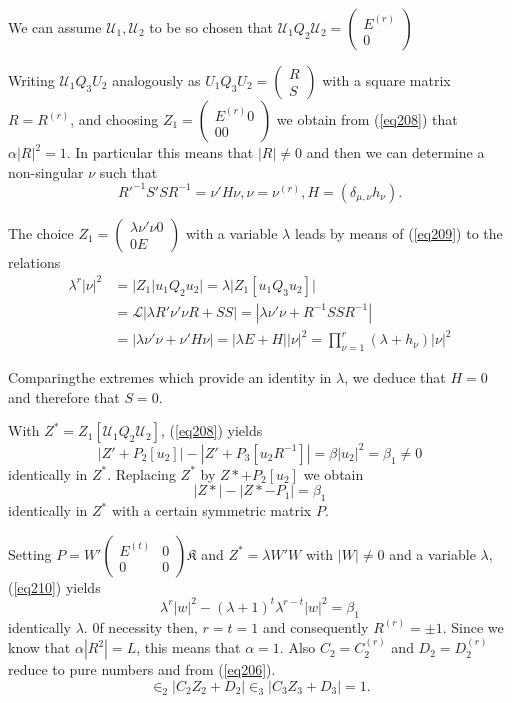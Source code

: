  We can assume $\mathcal{U}_1 , \mathcal{U}_2$ to be so chosen that
 $\mathcal{U}_1 Q_2 \mathcal{U}_ 
 2 = \begin{pmatrix} E^{(r)}\\ 0 \end{pmatrix}$
 
 Writing $\mathcal{U}_1 Q_3  U_2$ analogously as $U_1 Q_3 U_2
 = \begin{pmatrix}  R \\ S \end{pmatrix}$ with a square matrix $R = R
 ^{(r)}$, and choosing $Z_1 = \begin{pmatrix} E^{(r)} 0 \\ 0
   0 \end{pmatrix}$ we obtain from (\ref{eq208}) that $\alpha |R|^2 =1$. In
 particular this means that $|R| \neq 0$ and then we can determine a
 non-singular $\nu$ such that 
 $$
 R'^{-1}S' S R^{-1} = \nu' H \nu , \nu = \nu^{(r)}, H = (\delta_{\mu ,
   \nu} h_{\nu}). 
 $$
 
 The choice $Z_1 = \begin{pmatrix} \lambda \nu' \nu  0 \\ 0
   E \end{pmatrix}$ with a variable $\lambda$ leads by means of
(\ref{eq209}) to the relations 
 \begin{align*}
\lambda^r |\nu |^2 & = | Z_1 | u_1 Q_2 u_2 | = \lambda |Z_1 [ u_1 Q_3 u_2] |\\
& = \mathcal{L}|\lambda R' \nu' \nu R + S S | = |\lambda \nu' \nu +
R^{-1} S S R^{-1}|\\ 
&= |\lambda \nu' \nu + \nu' H \nu | = |\lambda E + H || \nu|^2 =
\prod_{\nu=1}^{r} (\lambda + h_{\nu}) |\nu|^2  
 \end{align*} 
 
 Comparing\pageoriginale the extremes which provide an identity in
 $\lambda$, we deduce that $H = 0$ and therefore that $S= 0$.   
 
 With $Z^* = Z_1 [\mathcal{U}_1 Q_2 \mathcal{U}_2]$, (\ref{eq208})  yields 
 $$
 |Z' + P_2 [u_2] | - |Z' + P_3 [u_2 R^{-1}] | =  \beta |u_2|^2 =
 \beta_1 \neq 0 
 $$
 identically in $Z^*$. Replacing $Z^*$ by $Z* + P_2 [u_2]$ we obtain 
 \begin{equation*}
|Z* | - |Z* - P_1| = \beta_1 \tag{210}\label{eq210} 
 \end{equation*} 
 identically in $Z^*$ with a certain symmetric matrix $P$. 
 
 Setting $P = W' \begin{pmatrix} E^{(t)} & 0 \\ 0 & 0 \end{pmatrix}
 \mathfrak{K}$  and $Z^* = \lambda W' W$ with $|W| \neq 0$ and a
 variable $\lambda$, (\ref{eq210}) yields 
 $$
 \lambda^r |w|^2 - (\lambda + 1)^t \lambda^{r-t} |w|^2 = \beta_1 
 $$
 identically $\lambda$. 0f necessity then, $ r = t = 1$ and
 consequently $R^{(r)} = \pm 1$. Since we know that $\alpha |R^2| = L
 $, this means that $\alpha = 1$. Also $C_2 = C_2 ^{(r)}$ and $D_2=
 D_2^{(r)}$ reduce to pure numbers and from (\ref{eq206}). 
 $$
 \in_2 |C_2 Z_2 + D_2 | \in_3 |C_3 Z_3 + D_3 | = 1.
 $$
 
